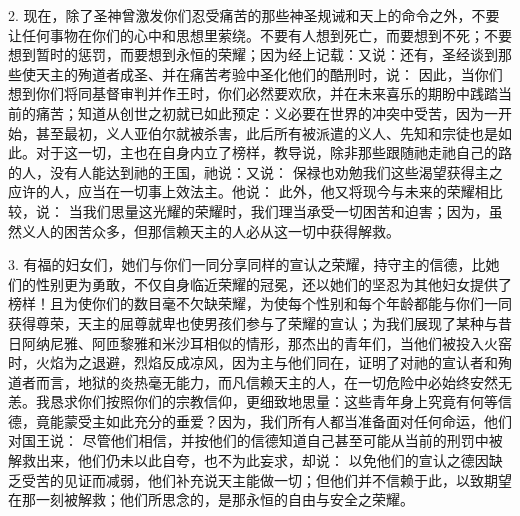 2. 现在，除了圣神曾激发你们忍受痛苦的那些神圣规诫和天上的命令之外，不要让任何事物在你们的心中和思想里萦绕。不要有人想到死亡，而要想到不死；不要想到暂时的惩罚，而要想到永恒的荣耀；因为经上记载：又说：还有，圣经谈到那些使天主的殉道者成圣、并在痛苦考验中圣化他们的酷刑时，说： 因此，当你们想到你们将同基督审判并作王时，你们必然要欢欣，并在未来喜乐的期盼中践踏当前的痛苦；知道从创世之初就已如此预定：义必要在世界的冲突中受苦，因为一开始，甚至最初，义人亚伯尔就被杀害，此后所有被派遣的义人、先知和宗徒也是如此。对于这一切，主也在自身内立了榜样，教导说，除非那些跟随祂走祂自己的路的人，没有人能达到祂的王国，祂说：又说： 保禄也劝勉我们这些渴望获得主之应许的人，应当在一切事上效法主。他说： 此外，他又将现今与未来的荣耀相比较，说： 当我们思量这光耀的荣耀时，我们理当承受一切困苦和迫害；因为，虽然义人的困苦众多，但那信赖天主的人必从这一切中获得解救。\par

3. 有福的妇女们，她们与你们一同分享同样的宣认之荣耀，持守主的信德，比她们的性别更为勇敢，不仅自身临近荣耀的冠冕，还以她们的坚忍为其他妇女提供了榜样！且为使你们的数目毫不欠缺荣耀，为使每个性别和每个年龄都能与你们一同获得尊荣，天主的屈尊就卑也使男孩们参与了荣耀的宣认；为我们展现了某种与昔日阿纳尼雅、阿匝黎雅和米沙耳相似的情形，那杰出的青年们，当他们被投入火窑时，火焰为之退避，烈焰反成凉风，因为主与他们同在，证明了对祂的宣认者和殉道者而言，地狱的炎热毫无能力，而凡信赖天主的人，在一切危险中必始终安然无恙。我恳求你们按照你们的宗教信仰，更细致地思量：这些青年身上究竟有何等信德，竟能蒙受主如此充分的垂爱？因为，我们所有人都当准备面对任何命运，他们对国王说： 尽管他们相信，并按他们的信德知道自己甚至可能从当前的刑罚中被解救出来，他们仍未以此自夸，也不为此妄求，却说： 以免他们的宣认之德因缺乏受苦的见证而减弱，他们补充说天主能做一切；但他们并不信赖于此，以致期望在那一刻被解救；他们所思念的，是那永恒的自由与安全之荣耀。\par

